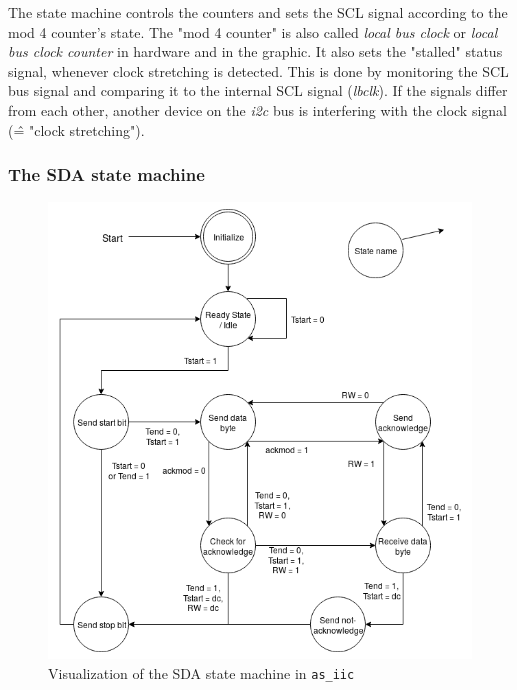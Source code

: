 The state machine controls the counters and sets the SCL signal according to the mod 4 counter's state.
The "mod 4 counter" is also called \textit{local bus clock} or \textit{local bus clock counter} in hardware and in the graphic.
It also sets the "stalled" status signal, whenever clock stretching is detected.
This is done by monitoring the SCL bus signal and comparing it to the internal SCL signal (\textit{lbclk}).
If the signals differ from each other, another device on the \textit{i2c} bus is interfering with the clock signal (\^= "clock stretching").


\subsubsection*{The SDA state machine}

\begin{figure}[htbp]
\noindent \begin{centering}
\includegraphics[width=\textwidth]{figs/07-05-as-iic-statemachine}
\par\end{centering}
\caption{Visualization of the SDA state machine in \texttt{as\_iic}}
\label{07-05-as-iic-states}
\end{figure}

